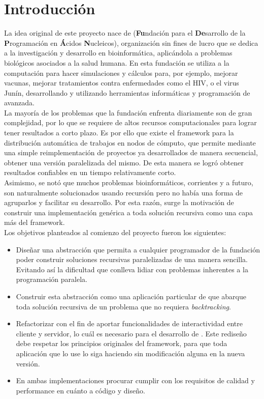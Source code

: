 \chapter{Introducción}

La idea original de este proyecto nace de \fude{} (\textbf{Fu}ndación para el \textbf{De}sarrollo de la \textbf{P}rogramación en
\textbf{Á}cidos \textbf{N}ucleicos), organización sin fines de lucro que se dedica a la investigación y desarrollo en bioinformática,
aplicándola a problemas biológicos asociados a la salud humana. En esta fundación se utiliza a la computación para hacer simulaciones y
cálculos para, por ejemplo, mejorar vacunas, mejorar tratamientos contra enfermedades como el HIV, o el virus Junín, desarrollando y
utilizando herramientas informáticas y programación de avanzada.\\

La mayoría de los problemas que la fundación enfrenta diariamente son de gran complejidad, por lo que se requiere de altos recursos
computacionales para lograr tener resultados a corto plazo. Es por ello que existe el framework \fud\cite{clus09} para la distribución
automática de trabajos en nodos de cómputo, que permite mediante una simple reimplementación de proyectos ya desarrollados de manera
secuencial, obtener una versión paralelizada del mismo. De esta manera se logró obtener resultados confiables en un tiempo relativamente
corto.\\

Asimismo, se notó que muchos problemas bioinformáticos, corrientes y a futuro, son naturalmente solucionados usando recursión pero no había
una forma de agruparlos y facilitar su desarrollo. Por esta razón, surge la motivación de construir una implementación genérica a toda
solución recursiva como una capa más del framework.\\

Los objetivos planteados al comienzo del proyecto fueron los siguientes:
\begin{itemize}
    \item   Diseñar una abstracción que permita a cualquier programador de la fundación poder construir soluciones recursivas paralelizadas
            de una manera sencilla. Evitando así la dificultad que conlleva lidiar con problemas inherentes a la programación paralela.
    \item   Construir esta abstracción como una aplicación particular de \fud{} que abarque toda solución recursiva de un problema que no
            requiera \textit{backtracking}.
    \item   Refactorizar \fud{} con el fin de aportar funcionalidades de interactividad entre cliente y servidor, lo cuál es necesario para
            el desarrollo de \rc. Este rediseño debe respetar los principios originales del framework, para que toda aplicación que lo use
            lo siga haciendo sin modificación alguna en la nueva versión.
    \item   En ambas implementaciones procurar cumplir con los requisitos de calidad y performance en cuánto a código y diseño.
\end{itemize}


